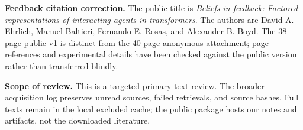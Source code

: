 \documentclass[11pt,letterpaper]{article}
\begin{document}
\textbf{Feedback citation correction.} The public title is \emph{Beliefs in feedback: Factored representations of interacting agents in transformers}. The authors are David A. Ehrlich, Manuel Baltieri, Fernando E. Rosas, and Alexander B. Boyd. The 38-page public v1 is distinct from the 40-page anonymous attachment; page references and experimental details have been checked against the public version rather than transferred blindly.

\textbf{Scope of review.} This is a targeted primary-text review. The broader acquisition log preserves unread sources, failed retrievals, and source hashes. Full texts remain in the local excluded cache; the public package hosts our notes and artifacts, not the downloaded literature.
\end{document}
